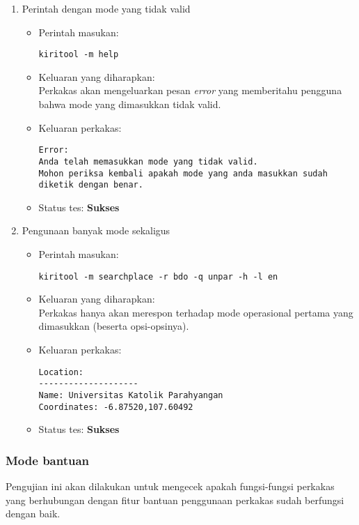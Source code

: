 \begin{enumerate}
	\item Perintah dengan mode yang tidak valid
	\begin{itemize}
		\item Perintah masukan:
		\begin{verbatim}
kiritool -m help
		\end{verbatim}
		\item Keluaran yang diharapkan: \\
		Perkakas akan mengeluarkan pesan \textit{error} yang memberitahu pengguna bahwa mode yang dimasukkan tidak valid.
		\item Keluaran perkakas:
		\begin{lstlisting}
Error:
Anda telah memasukkan mode yang tidak valid.
Mohon periksa kembali apakah mode yang anda masukkan sudah diketik dengan benar.
		\end{lstlisting}
		\item Status tes: \textbf{Sukses}
	\end{itemize}
	
	\item Pengunaan banyak mode sekaligus
	\begin{itemize}
		\item Perintah masukan:
		\begin{verbatim}
kiritool -m searchplace -r bdo -q unpar -h -l en
		\end{verbatim}
		\item Keluaran yang diharapkan: \\
		Perkakas hanya akan merespon terhadap mode operasional pertama yang dimasukkan (beserta opsi-opsinya).
		\item Keluaran perkakas:
		\begin{lstlisting}
Location:
--------------------
Name: Universitas Katolik Parahyangan
Coordinates: -6.87520,107.60492
		\end{lstlisting}
		\item Status tes: \textbf{Sukses}
	\end{itemize}

\end{enumerate}

\subsubsection{Mode bantuan}
\label{sec:testing-experiments-testing-help}

Pengujian ini akan dilakukan untuk mengecek apakah fungsi-fungsi perkakas yang berhubungan dengan fitur bantuan penggunaan perkakas sudah berfungsi dengan baik.

